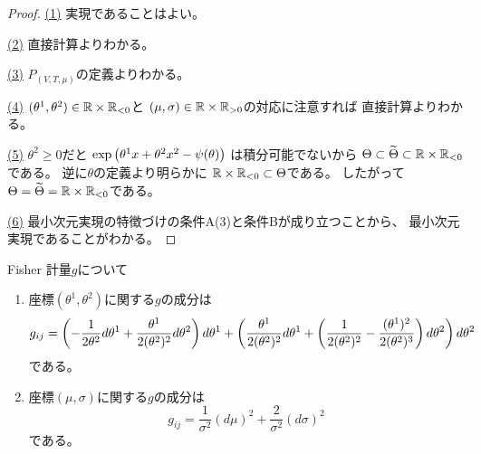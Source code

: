 \documentclass[report]{jlreq}
\begin{document}
\begin{proof}
    \uline{(1)} \quad
    実現であることはよい。

    \uline{(2)} \quad
    直接計算よりわかる。

    \uline{(3)} \quad
    $P_{(V, T, \mu)}$の定義よりわかる。

    \uline{(4)} \quad
    $(\theta^1, \theta^2) \in \mathbb{R} \times \mathbb{R}_{< 0}$と
    $(\mu, \sigma) \in \mathbb{R} \times \mathbb{R}_{> 0}$の対応に注意すれば
    直接計算よりわかる。

    \uline{(5)} \quad
    $\theta^2 \ge 0$だと
    $\exp\left({
        \theta^1 x
        + \theta^2 x^2
        - \psi(\theta)
    }\right)$
    は積分可能でないから
    $\Theta \subset \widetilde{\Theta} \subset \mathbb{R} \times \mathbb{R}_{< 0}$
    である。
    逆に$\theta$の定義より明らかに
    $\mathbb{R} \times \mathbb{R}_{< 0} \subset \Theta$である。
    したがって
    $\Theta = \widetilde{\Theta} = \mathbb{R} \times \mathbb{R}_{< 0}$である。

    \uline{(6)} \quad
    最小次元実現の特徴づけの条件A(3)と条件Bが成り立つことから、
    最小次元実現であることがわかる。
\end{proof}

\begin{proposition}
    Fisher 計量$g$について
    \begin{enumerate}
        \item 座標$(\theta^1, \theta^2)$に関する$g$の成分は
            \begin{equation}
                g_{ij}
                    =
                        \left({
                            -\frac{1}{2\theta^2}
                            d\theta^1
                            + \frac{\theta^1}{2(\theta^2)^2}
                            d\theta^2
                        }\right)
                        d\theta^1
                        +
                        \left({
                            \frac{\theta^1}{2(\theta^2)^2}
                            d\theta^1
                            + \left({
                                \frac{1}{2(\theta^2)^2}
                                - \frac{(\theta^1)^2}{2(\theta^2)^3}
                            }\right)
                            d\theta^2
                        }\right)
                        d\theta^2
            \end{equation}
            である。
        \item 座標$(\mu, \sigma)$に関する$g$の成分は
            \begin{equation}
                g_{ij}
                    =
                        \frac{1}{\sigma^2} (d\mu)^2
                        + \frac{2}{\sigma^2} (d\sigma)^2
            \end{equation}
            である。
    \end{enumerate}
\end{proposition}
\end{document}
